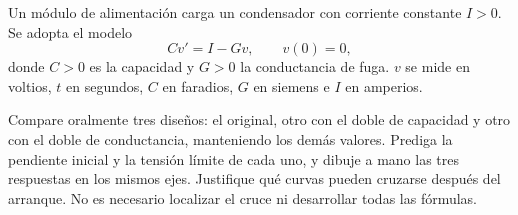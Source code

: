 Un módulo de alimentación carga un condensador con corriente constante \(I>0\). Se adopta el modelo
\[
C v'=I-Gv,\qquad v(0)=0,
\]
donde \(C>0\) es la capacidad y \(G>0\) la conductancia de fuga. \(v\) se mide en voltios, \(t\) en segundos, \(C\) en faradios, \(G\) en siemens e \(I\) en amperios.

Compare oralmente tres diseños: el original, otro con el doble de capacidad y otro con el doble de conductancia, manteniendo los demás valores. Prediga la pendiente inicial y la tensión límite de cada uno, y dibuje a mano las tres respuestas en los mismos ejes. Justifique qué curvas pueden cruzarse después del arranque. No es necesario localizar el cruce ni desarrollar todas las fórmulas.
